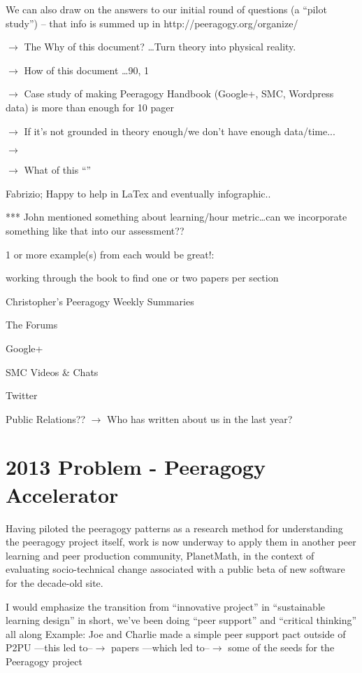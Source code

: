 \documentclass{acm_proc_article-sp}
\begin{document}
We can also draw on the answers to our initial round of questions (a ``pilot study'') -- that info is summed up in http://peeragogy.org/organize/

$\rightarrow$ The Why of this document? \ldots Turn theory into physical reality.

$\rightarrow$ How of this document \ldots 90, 1 %

$\rightarrow$ Case study of making Peeragogy Handbook (Google+, SMC, Wordpress data) is more than enough for 10 pager

$\rightarrow$ If it's not grounded in theory enough/we don't have enough data/time...

$\rightarrow$

$\rightarrow$ What of this ``''


Fabrizio; Happy to help in LaTex and eventually infographic..

*** John mentioned something about learning/hour metric\ldots can we incorporate something like that into our assessment??

    1 or more example(s) from each would be great!:

        working through the book to find one or two papers per section

        Christopher's Peeragogy Weekly Summaries

        The Forums

        Google+

        SMC Videos \& Chats

        Twitter

    Public Relations?? $\rightarrow$ Who has written about us in the last year?


%
%
%
%

\section{2013 Problem - Peeragogy Accelerator}

Having piloted the peeragogy patterns as a research method for understanding the peeragogy project itself, work is now underway to apply them in another peer learning and peer production community, PlanetMath, in the context of evaluating socio-technical change associated with a public beta of new software for the decade-old site.

I would emphasize the transition from ``innovative project'' in ``sustainable learning design'' in short, we've been doing ``peer support'' and ``critical thinking'' all along
Example: Joe and Charlie made a simple peer support pact outside of P2PU ---this led to--$\rightarrow$ papers ---which led to--$\rightarrow$ some of the seeds for the Peeragogy project
\end{document}
